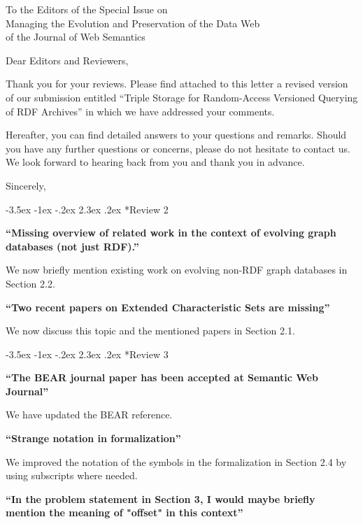 \documentclass{letter}
\makeatletter
\newcounter{section}
\newcommand\section{\@startsection {section}{1}{\z@}%
                                   {-3.5ex \@plus -1ex \@minus -.2ex}%
                                   {2.3ex \@plus.2ex}%
                                   {\normalfont\Large\bfseries}}
\makeatother
\begin{document}
\begin{letter}{To the Editors of the Special Issue on\\Managing the Evolution and Preservation of the Data Web\\of the Journal of Web Semantics}

\opening{Dear Editors and Reviewers,}

\bigskip

Thank you for your reviews.
Please find attached to this letter a revised version of our submission entitled
\enquote{Triple Storage for Random-Access Versioned Querying of RDF Archives}
in which we have addressed your comments.

\bigskip

Hereafter, you can find detailed answers to your questions and remarks.
Should you have any further questions or concerns, please do not hesitate to contact us.
We look forward to hearing back from you and thank you in advance.

\bigskip

\closing{Sincerely,}

\pagebreak
\section*{Review 2}

\textbf{\enquote{Missing overview of related work in the context of evolving graph databases (not just RDF).}}

We now briefly mention existing work on evolving non-RDF graph databases in Section 2.2.

\textbf{\enquote{Two recent papers on Extended Characteristic Sets are missing}}

We now discuss this topic and the mentioned papers in Section 2.1.

\section*{Review 3}

\textbf{\enquote{The BEAR journal paper has been accepted at Semantic Web Journal}}

We have updated the BEAR reference.

\textbf{\enquote{Strange notation in formalization}}

We improved the notation of the symbols in the formalization in Section 2.4 by using subscripts where needed.

\textbf{\enquote{In the problem statement in Section 3, I would maybe briefly mention the meaning of "offset" in this context}}


\end{letter}
\end{document}
